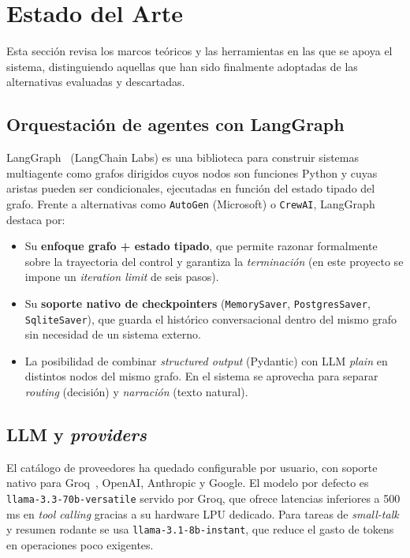 \section{Estado del Arte}
\label{sec:estado-arte}

Esta sección revisa los marcos teóricos y las herramientas en las que
se apoya el sistema, distinguiendo aquellas que han sido finalmente
adoptadas de las alternativas evaluadas y descartadas.

\subsection{Orquestación de agentes con LangGraph}

LangGraph~\cite{langgraph} (LangChain Labs) es una biblioteca para
construir sistemas multiagente como grafos dirigidos cuyos nodos son
funciones Python y cuyas aristas pueden ser condicionales,
ejecutadas en función del estado tipado del grafo. Frente a
alternativas como \texttt{AutoGen} (Microsoft) o \texttt{CrewAI},
LangGraph destaca por:

\begin{itemize}[leftmargin=1.5em,itemsep=0.2em]
  \item Su \textbf{enfoque grafo + estado tipado}, que permite
        razonar formalmente sobre la trayectoria del control y
        garantiza la \textit{terminación} (en este proyecto se
        impone un \textit{iteration limit} de seis pasos).
  \item Su \textbf{soporte nativo de checkpointers} (\texttt{MemorySaver},
        \texttt{PostgresSaver}, \texttt{SqliteSaver}), que guarda
        el histórico conversacional dentro del mismo grafo sin
        necesidad de un sistema externo.
  \item La posibilidad de combinar \textit{structured output}
        (Pydantic) con LLM \textit{plain} en distintos nodos del
        mismo grafo. En el sistema se aprovecha para separar
        \textit{routing} (decisión) y \textit{narración} (texto
        natural).
\end{itemize}

\subsection{LLM y \textit{providers}}

El catálogo de proveedores ha quedado configurable por usuario, con
soporte nativo para Groq~\cite{groq}, OpenAI, Anthropic y Google. El
modelo por defecto es \texttt{llama-3.3-70b-versatile} servido por
Groq, que ofrece latencias inferiores a 500\,ms en \textit{tool
calling} gracias a su hardware LPU dedicado. Para tareas de
\textit{small-talk} y resumen rodante se usa
\texttt{llama-3.1-8b-instant}, que reduce el gasto de tokens en
operaciones poco exigentes.

